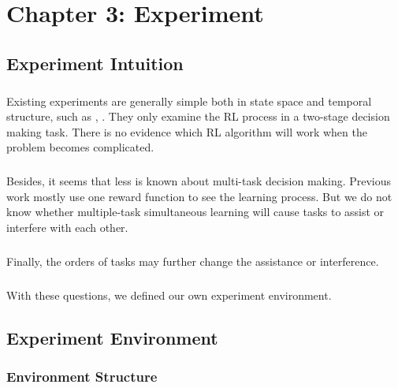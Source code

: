 
\chapter{Chapter 3: Experiment} %

\label{Chapter 3} %

\section{Experiment Intuition}
\label{sec:Experiment Intuition and Environment}
\paragraph{}
Existing experiments are generally simple both in state space and temporal structure, such as \citet{glascher2010states}, \citet{daw2011model}. They only examine the RL process in a two-stage decision making task. There is no evidence which RL algorithm will work when the problem becomes complicated. 

\paragraph{}
Besides, it seems that less is known about multi-task decision making. Previous work mostly use one reward function to see the learning process. But we do not know whether multiple-task simultaneous learning will cause tasks to assist or interfere with each other. 

\paragraph{}
Finally, the orders of tasks may further change the assistance or interference. 

\paragraph{}
With these questions, we defined our own experiment environment. 

\section{Experiment Environment}
\label{sec:Experiment Environment}
\subsection{Environment Structure}
\label{sec:Experiment Environment}

